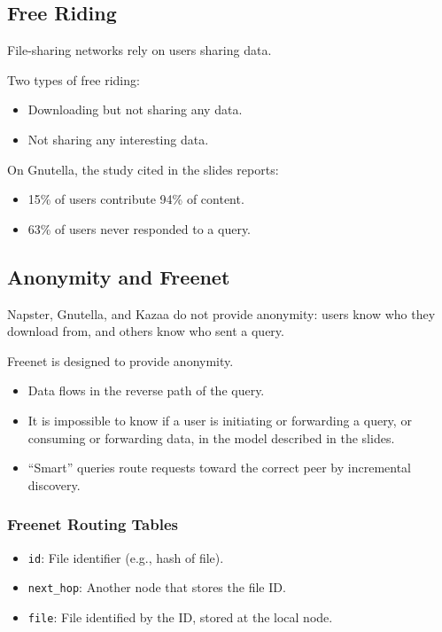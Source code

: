 \documentclass{article}
\begin{document}
\subsection{Free Riding}

File-sharing networks rely on users sharing data.

Two types of free riding:
\begin{itemize}
    \item Downloading but not sharing any data.
    \item Not sharing any interesting data.
\end{itemize}

On Gnutella, the study cited in the slides reports:
\begin{itemize}
    \item 15\% of users contribute 94\% of content.
    \item 63\% of users never responded to a query.
\end{itemize}

\subsection{Anonymity and Freenet}

Napster, Gnutella, and Kazaa do not provide anonymity: users know who they download from, and others know who sent a query.

Freenet is designed to provide anonymity.

\begin{itemize}
    \item Data flows in the reverse path of the query.
    \item It is impossible to know if a user is initiating or forwarding a query, or consuming or forwarding data, in the model described in the slides.
    \item ``Smart'' queries route requests toward the correct peer by incremental discovery.
\end{itemize}

\subsubsection{Freenet Routing Tables}
\begin{itemize}
    \item \texttt{id}: File identifier (e.g., hash of file).
    \item \texttt{next\_hop}: Another node that stores the file ID.
    \item \texttt{file}: File identified by the ID, stored at the local node.
\end{itemize}
\end{document}

